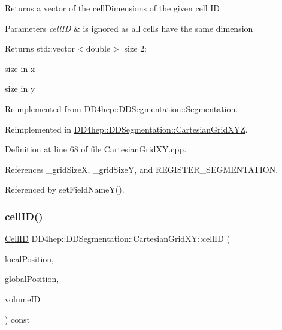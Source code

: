 Returns a vector of the cell\+Dimensions of the given cell ID 
\begin{DoxyParams}{Parameters}
{\em cell\+ID} & is ignored as all cells have the same dimension \\
\hline
\end{DoxyParams}
\begin{DoxyReturn}{Returns}
std\+::vector$<$double$>$ size 2\+:
\begin{DoxyEnumerate}
\item size in x
\item size in y 
\end{DoxyEnumerate}
\end{DoxyReturn}


Reimplemented from \hyperlink{class_d_d4hep_1_1_d_d_segmentation_1_1_segmentation_ac2119ba64c9805751e08b6100ef6fee6}{D\+D4hep\+::\+D\+D\+Segmentation\+::\+Segmentation}.



Reimplemented in \hyperlink{class_d_d4hep_1_1_d_d_segmentation_1_1_cartesian_grid_x_y_z_a98f90a0621c750a6bdbcdbb27468b3a1}{D\+D4hep\+::\+D\+D\+Segmentation\+::\+Cartesian\+Grid\+X\+YZ}.



Definition at line 68 of file Cartesian\+Grid\+X\+Y.\+cpp.



References \+\_\+grid\+SizeX, \+\_\+grid\+SizeY, and R\+E\+G\+I\+S\+T\+E\+R\+\_\+\+S\+E\+G\+M\+E\+N\+T\+A\+T\+I\+ON.



Referenced by set\+Field\+Name\+Y().

\hypertarget{class_d_d4hep_1_1_d_d_segmentation_1_1_cartesian_grid_x_y_a06e75589ebca4af45178854dc341b9c0}{}\label{class_d_d4hep_1_1_d_d_segmentation_1_1_cartesian_grid_x_y_a06e75589ebca4af45178854dc341b9c0} 
\subsubsection{\texorpdfstring{cell\+I\+D()}{cellID()}}
{\footnotesize\ttfamily \hyperlink{namespace_d_d4hep_1_1_d_d_segmentation_ac7af071d85cb48820914434a07e21ba1}{Cell\+ID} D\+D4hep\+::\+D\+D\+Segmentation\+::\+Cartesian\+Grid\+X\+Y\+::cell\+ID (\begin{DoxyParamCaption}\item[{const \hyperlink{struct_d_d4hep_1_1_d_d_segmentation_1_1_vector3_d}{Vector3D} \&}]{local\+Position,  }\item[{const \hyperlink{struct_d_d4hep_1_1_d_d_segmentation_1_1_vector3_d}{Vector3D} \&}]{global\+Position,  }\item[{const \hyperlink{namespace_d_d4hep_1_1_d_d_segmentation_a61a6833a18d1800bdef176595f83e3ba}{Volume\+ID} \&}]{volume\+ID }\end{DoxyParamCaption}) const\hspace{0.3cm}{\ttfamily [virtual]}}



